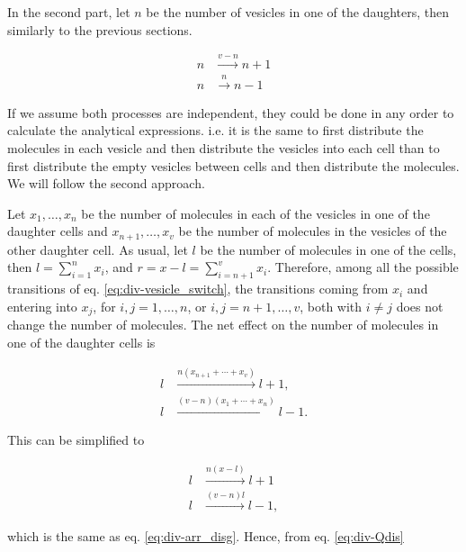 In the second part, let $n$ be the number of vesicles in one of the daughters, then similarly to the previous sections.

\begin{equation}
  \label{eq:div-arr_clust}
  \begin{split}
    n &\xrightarrow{v-n} n+1\\
    n &\xrightarrow{n} n-1
  \end{split}
\end{equation}

If we assume both processes are independent, they could be done in any order to calculate the analytical expressions. i.e. it is the same to first distribute the molecules in each vesicle and then distribute the vesicles into each cell than to first distribute the empty vesicles between cells and then distribute the molecules. We will follow the second approach.

Let $x_1,\dotsc,x_n$ be the number of molecules in each of the vesicles in one of the daughter cells and $x_{n+1},\dotsc,x_v$ be the number of molecules in the vesicles of the other daughter cell. As usual, let $l$ be the number of molecules in one of the cells, then $l = \sum_{i=1}^nx_i$, and $r = x-l = \sum_{i=n+1}^vx_i$. Therefore, among all the possible transitions of eq. \eqref{eq:div-vesicle_switch}, the transitions coming from $x_i$ and entering into $x_j$, for $i,j=1,\dotsc,n$, or $i,j=n+1,\dotsc,v$, both with $i\neq j$ does not change the number of molecules. The net effect on the number of molecules in one of the daughter cells is

\begin{equation}
  \begin{split}
    l&\xrightarrow{n(x_{n+1}+\dotsb+x_{v})}l+1,\\
    l&\xrightarrow{(v-n)(x_1+\dotsb+x_n)}l-1.
  \end{split}
\end{equation}

This can be simplified to

\begin{equation}
  \begin{split}
    l&\xrightarrow{n(x-l)}l+1\\
    l&\xrightarrow{(v-n)l}l-1,
  \end{split}
\end{equation}

which is the same as eq. \eqref{eq:div-arr_disg}. Hence, from eq. \eqref{eq:div-Qdis}

